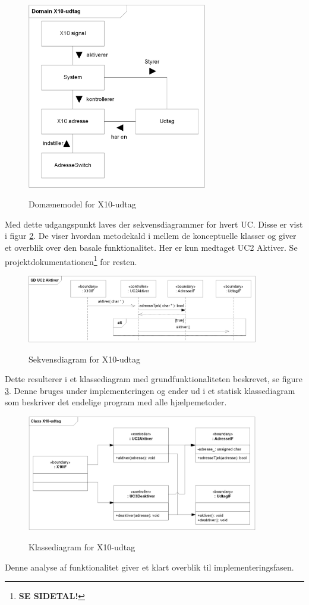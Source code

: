 \begin{figure}[!htb]
     \centering
     { \includegraphics[width=0.7\textwidth]{Billeder/UML/X10_modtager_Domain}}
     \caption{Domænemodel for X10-udtag}
     \label{fig:X10_udtag_domaenemodel}
\end{figure}

Med dette udgangspunkt laves der sekvensdiagrammer for hvert UC. Disse er vist i figur \ref{fig:X10_udtag_sd}. De viser hvordan metodekald i mellem de konceptuelle klasser og giver et overblik over den basale funktionalitet. Her er kun medtaget UC2 Aktiver. Se projektdokumentationen\footnote{\textbf{SE SIDETAL!}} for resten.

\begin{figure}[!htb]
     \centering
     { \includegraphics[width=0.9\textwidth]{Billeder/UML/X10_modtager_SD}}
     \caption{Sekvensdiagram for X10-udtag}
     \label{fig:X10_udtag_sd}
\end{figure}

Dette resulterer i et klassediagram med grundfunktionaliteten beskrevet, se figure \ref{fig:X10_udtag_class}. Denne bruges under implementeringen og ender ud i et statisk klassediagram som beskriver det endelige program med alle hjælpemetoder.

\begin{figure}[!htb]
     \centering
     { \includegraphics[width=0.9\textwidth]{Billeder/UML/X10_modtager_Class}}
     \caption{Klassediagram for X10-udtag}
     \label{fig:X10_udtag_class}
\end{figure}

Denne analyse af funktionalitet giver et klart overblik til implementeringsfasen.